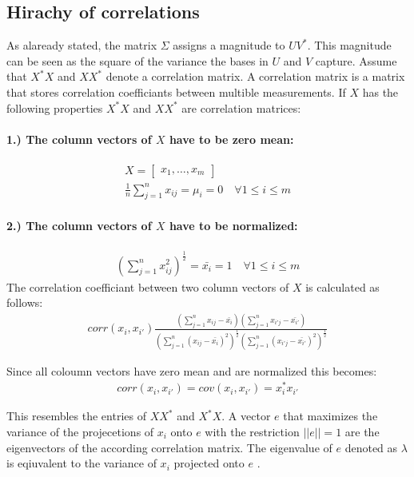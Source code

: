 \subsection{Hirachy of correlations}
As alaready stated, the matrix \(\Sigma\) assigns a magnitude to \(UV^{*}\).
This magnitude can be seen as the square of the variance the bases in \(U\) and \(V\) capture.
Assume that \(X^{*}X\) and \(XX^{*}\) denote a correlation matrix.
\cite{brunton_kutz_2019}
A correlation matrix is a matrix that stores correlation coefficiants between multible measurements. 
If \(X\) has the following properties \(X^{*}X\) and \(XX^{*}\) are correlation matrices:
\paragraph{1.) The column vectors of \(X\) have to be zero mean:}
\begin{gather}
X = \begin{bmatrix}
x_1, \hdots, x_m
\end{bmatrix} \\
\frac{1}{n}\sum_{j = 1}^{n} x_{ij} = \mu_{i} = 0 \quad \forall 1 \leq i \leq m
\end{gather}
\paragraph{2.) The column vectors of \(X\) have to be normalized:}
\begin{gather}
(\sum_{j = 1}^{n} x_{ij}^{2})^{\frac{1}{2}} = \bar{x_i} = 1 \quad \forall 1 \leq i \leq m
\end{gather}
The correlation coefficiant between two column vectors of \(X\) is calculated as follows:
\begin{gather}
corr(x_i, x_{i'})\frac{(\sum_{j = 1}^{n} x_{ij} - \bar{x_i})(\sum_{j = 1}^{n} x_{i'j} - \bar{x_{i'}})}{(\sum_{j = 1}^{n} (x_{ij}- \bar{x_{i}})^{2})^{\frac{1}{2}}(\sum_{j = 1}^{n} (x_{i'j}-  \bar{x_{i'}})^{2})^{\frac{1}{2}}}
\end{gather}
\cite{Suga}


Since all coloumn vectors have zero mean and are normalized this becomes:
\begin{gather}
corr(x_i, x_{i'}) = cov(x_i, x_{i'})= x_i^{*}x_{i'}
\end{gather}
\cite{harv}


This resembles the entries of \(XX^{*}\) and \(X^{*}X\).
A vector \(e\) that maximizes the variance of the projecetions of \(x_i\) onto \(e\)  with the restriction \(||e|| = 1\) are the eigenvectors of the according correlation matrix.
The eigenvalue of \(e\) denoted as \(\lambda\) is eqiuvalent to the variance of \(x_i\) projected onto \(e\) \cite{Lavrenko}.

